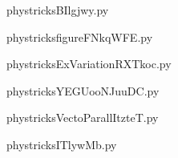 
    \newcommand{\CaptionFigBIlgjwy}{<+Type your caption here+>}
    \begin{center}
        
    \end{center}
    phystricksBIlgjwy.py

    

    \clearpage
    


    \newcommand{\CaptionFigfigureFNkqWFE}{<+Type your caption here+>}
    \begin{center}
        
    \end{center}
    phystricksfigureFNkqWFE.py

    

    \clearpage
    


    \newcommand{\CaptionFigExVariationRXTkoc}{<+Type your caption here+>}
    \begin{center}
        
    \end{center}
    phystricksExVariationRXTkoc.py

    

    \clearpage
    


    \newcommand{\CaptionFigYEGUooNJuuDC}{<+Type your caption here+>}
    \begin{center}
        
    \end{center}
    phystricksYEGUooNJuuDC.py

    

    \clearpage
    


    \newcommand{\CaptionFigVectoParallItzteT}{<+Type your caption here+>}
    \begin{center}
        
    \end{center}
    phystricksVectoParallItzteT.py

    

    \clearpage
    


    \newcommand{\CaptionFigITlywMb}{<+Type your caption here+>}
    \begin{center}
        
    \end{center}
    phystricksITlywMb.py

